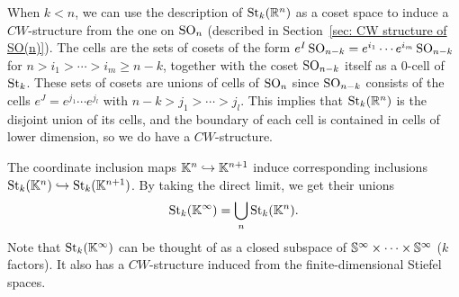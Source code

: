 When $k<n$, we can use the description of $\operatorname{St}_k(\mathbb{R}^n)$ as a coset space to induce a $CW$-structure from the one on $\operatorname{SO}_n$ (described in Section~\ref{sec: CW structure of SO(n)}). The cells are the sets of cosets of the form $e^I\operatorname{SO}_{n-k}=e^{i_1}\cdots e^{i_m}\operatorname{SO}_{n-k}$ for $n>i_1>\cdots >i_m\geq n-k$, together with the coset $\operatorname{SO}_{n-k}$ itself as a $0$-cell of $\operatorname{St}_k$. These sets of cosets are unions of cells of $\operatorname{SO}_n$ since $\operatorname{SO}_{n-k}$ consists of the cells $e^J=e^{j_1}\cdots e^{j_l}$ with $n-k>j_1>\cdots >j_l$. This implies that $\operatorname{St}_k(\mathbb{R}^n)$ is the disjoint union of its cells, and the boundary of each cell is contained in cells of lower dimension, so we do have a $CW$-structure.


\begin{defn}
    The coordinate inclusion maps $\mathbb{K}^n\hookrightarrow \mathbb{K}^{n+1}$ induce corresponding inclusions $\operatorname{St}_k(\mathbb{K}^n)\hookrightarrow \operatorname{St}_k(\mathbb{K}^{n+1})$. By taking the direct limit, we get their unions
    \[\operatorname{St}_k(\mathbb{K}^\infty)=\bigcup_n \operatorname{St}_k(\mathbb{K}^n).\]
    Note that $\operatorname{St}_k(\mathbb{K}^\infty)$ can be thought of as a closed subspace of $\mathbb{S}^\infty\times\cdots\times \mathbb{S}^\infty$ ($k$ factors). It also has a $CW$-structure induced from the finite-dimensional Stiefel spaces.
\end{defn}




